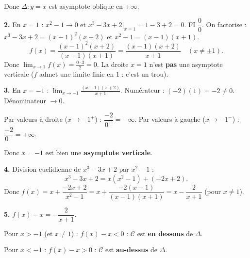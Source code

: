 Donc $\Delta : y=x$ est asymptote oblique en $\pm\infty$.

\textbf{2.} En $x=1$ : $x^2-1\to 0$ et
$x^3-3x+2\big|_{x=1}=1-3+2=0$.
FI $\dfrac{0}{0}$. On factorise :
$x^3-3x+2=(x-1)^2(x+2)$ et $x^2-1=(x-1)(x+1)$.
\[
f(x)=\frac{(x-1)^2(x+2)}{(x-1)(x+1)}=\frac{(x-1)(x+2)}{x+1}
\quad (x\neq\pm 1).
\]
Donc $\displaystyle\lim_{x\to 1}f(x)=\frac{0\cdot3}{2}=0$.
La droite $x=1$ n'est \textbf{pas} une asymptote verticale
($f$ admet une limite finie en 1 : c'est un trou).

\textbf{3.} En $x=-1$ :
$\displaystyle\lim_{x\to-1}\frac{(x-1)(x+2)}{x+1}$.
Numérateur : $(-2)(1)=-2\neq 0$. Dénominateur $\to 0$.

Par valeurs à droite ($x\to-1^+$) : $\dfrac{-2}{0^+}=-\infty$.
Par valeurs à gauche ($x\to-1^-$) : $\dfrac{-2}{0^-}=+\infty$.

Donc $x=-1$ est bien une \textbf{asymptote verticale}.

\textbf{4.} Division euclidienne de $x^3-3x+2$ par $x^2-1$ :
\[
x^3-3x+2 = x(x^2-1)+(-2x+2).
\]
Donc $f(x)=x+\dfrac{-2x+2}{x^2-1}=x+\dfrac{-2(x-1)}{(x-1)(x+1)}
=x-\dfrac{2}{x+1}$ (pour $x\neq 1$).

\textbf{5.} $f(x)-x=-\dfrac{2}{x+1}$.

Pour $x>-1$ (et $x\neq 1$) : $f(x)-x<0$ : $\mathcal{C}$ est
\textbf{en dessous} de $\Delta$.

Pour $x<-1$ : $f(x)-x>0$ : $\mathcal{C}$ est
\textbf{au-dessus} de $\Delta$.
